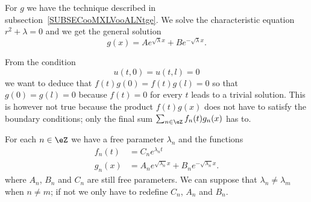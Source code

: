For \( g\) we have the technique described in subsection~\ref{SUBSECooMXLVooALNtge}. We solve the characteristic equation $r^2+\lambda=0$ and we get the general solution
\begin{equation}
    g(x)=A e^{\sqrt{ \lambda }x}+B e^{-\sqrt{ \lambda }x}.
\end{equation}

From the condition
\begin{equation}
    u(t,0)=u(t,l)=0
\end{equation}
we want to deduce that \( f(t)g(0)=f(t)g(l)=0\) so that \( g(0)=g(l)=0\) because \( f(t)=0\) for every \( t\) leads to a trivial solution. This is however not true because the product \( f(t)g(x)\) does not have to satisfy the boundary conditions; only the final sum \( \sum_{n\in \eZ}f_n(t)g_n(x)\) has to.

For each \( n\in \eZ\) we have a free parameter \( \lambda_n\) and the functions
\begin{subequations}
    \begin{align}
        f_n(t)&=C_n e^{\lambda_n t}\\
        g_n(x)&=A_n e^{\sqrt{ \lambda_n }x}+B_n e^{-\sqrt{ \lambda_n }x}.
    \end{align}
\end{subequations}
where \( A_n\), \( B_n\) and \( C_n\) are still free parameters. We can suppose that \( \lambda_n\neq \lambda_m\) when \( n\neq m\); if not we only have to redefine \( C_n\), \( A_n\) and \( B_n\).


